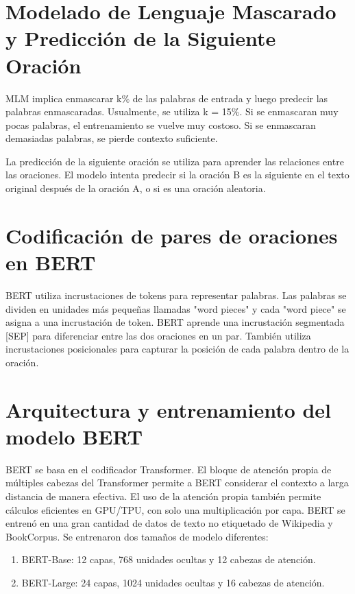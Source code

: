 \section{Modelado de Lenguaje Mascarado y Predicción de la Siguiente Oración}

MLM implica enmascarar k\% de las palabras de entrada y luego predecir las palabras enmascaradas. Usualmente, se utiliza k = 15\%. Si se enmascaran muy pocas palabras, el entrenamiento se vuelve muy costoso. Si se enmascaran demasiadas palabras, se pierde contexto suficiente.

La predicción de la siguiente oración se utiliza para aprender las relaciones entre las oraciones. El modelo intenta predecir si la oración B es la siguiente en el texto original después de la oración A, o si es una oración aleatoria.

\section{Codificación de pares de oraciones en BERT}

BERT utiliza incrustaciones de tokens para representar palabras. Las palabras se dividen en unidades más pequeñas llamadas "word pieces" y cada "word piece" se asigna a una incrustación de token. BERT aprende una incrustación segmentada [SEP] para diferenciar entre las dos oraciones en un par. También utiliza incrustaciones posicionales para capturar la posición de cada palabra dentro de la oración.

\section{Arquitectura y entrenamiento del modelo BERT}

BERT se basa en el codificador Transformer. El bloque de atención propia de múltiples cabezas del Transformer permite a BERT considerar el contexto a larga distancia de manera efectiva. El uso de la atención propia también permite cálculos eficientes en GPU/TPU, con solo una multiplicación por capa. BERT se entrenó en una gran cantidad de datos de texto no etiquetado de Wikipedia y BookCorpus. Se entrenaron dos tamaños de modelo diferentes:

\begin{enumerate}
\item BERT-Base: 12 capas, 768 unidades ocultas y 12 cabezas de atención.
\item BERT-Large: 24 capas, 1024 unidades ocultas y 16 cabezas de atención.
\end{enumerate}

